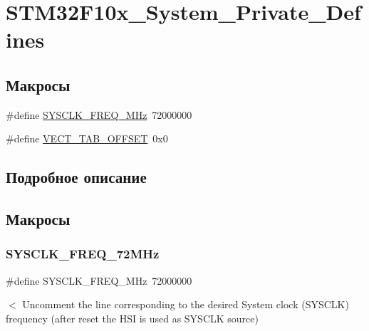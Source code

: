 \hypertarget{group___s_t_m32_f10x___system___private___defines}{}\section{S\+T\+M32\+F10x\+\_\+\+System\+\_\+\+Private\+\_\+\+Defines}
\label{group___s_t_m32_f10x___system___private___defines}
\subsection*{Макросы}
\begin{DoxyCompactItemize}
\item 
\#define \mbox{\hyperlink{group___s_t_m32_f10x___system___private___defines_ga69649cc38f34627cfb48b51062ebd390}{S\+Y\+S\+C\+L\+K\+\_\+\+F\+R\+E\+Q\+\_\+M\+Hz}}~72000000
\item 
\#define \mbox{\hyperlink{group___s_t_m32_f10x___system___private___defines_ga40e1495541cbb4acbe3f1819bd87a9fe}{V\+E\+C\+T\+\_\+\+T\+A\+B\+\_\+\+O\+F\+F\+S\+ET}}~0x0
\end{DoxyCompactItemize}


\subsection{Подробное описание}


\subsection{Макросы}
\mbox{\label{group___s_t_m32_f10x___system___private___defines_ga69649cc38f34627cfb48b51062ebd390}} 
\subsubsection{\texorpdfstring{SYSCLK\_FREQ\_72MHz}{SYSCLK\_FREQ\_72MHz}}
{\footnotesize\ttfamily \#define S\+Y\+S\+C\+L\+K\+\_\+\+F\+R\+E\+Q\+\_\+M\+Hz~72000000}

$<$ Uncomment the line corresponding to the desired System clock (S\+Y\+S\+C\+LK) frequency (after reset the H\+SI is used as S\+Y\+S\+C\+LK source)

